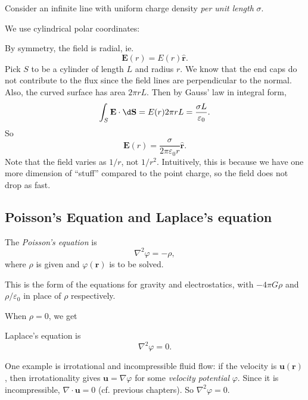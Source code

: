 \documentclass[a4paper]{article}
\begin{document}
\begin{eg}
  Consider an infinite line with uniform charge density \emph{per unit length} $\sigma$.

  We use cylindrical polar coordinates:
  \begin{center}
  \end{center}

  By symmetry, the field is radial, ie.
  \[
    \mathbf{E}(r) = E(r) \hat{\mathbf{r}}.
  \]
  Pick $S$ to be a cylinder of length $L$ and radius $r$. We know that the end caps do not contribute to the flux since the field lines are perpendicular to the normal. Also, the curved surface has area $2\pi r L$. Then by Gauss' law in integral form,
  \[
    \int_S\mathbf{E}\cdot \d \mathbf{S} = E(r)2\pi rL = \frac{\sigma L}{\varepsilon_0}.
  \]
  So
  \[
    \mathbf{E}(r) = \frac{\sigma}{2\pi \varepsilon_0 r} \hat{\mathbf{r}}.
  \]
  Note that the field varies as $1/r$, not $1/r^2$. Intuitively, this is because we have one more dimension of ``stuff'' compared to the point charge, so the field does not drop as fast.
\end{eg}

\subsection{Poisson's Equation and Laplace's equation}
\begin{defi}
  The \emph{Poisson's equation} is
  \[
    \nabla^2 \varphi = -\rho,
  \]
  where $\rho$ is given and $\varphi(\mathbf{r})$ is to be solved.
\end{defi}
This is the form of  the equations for gravity and electrostatics, with $-4\pi G \rho$ and $\rho/\varepsilon_0$ in place of $\rho$ respectively.

When $\rho = 0$, we get
\begin{defi}
  Laplace's equation is
  \[
    \nabla^2 \varphi = 0.
  \]
\end{defi}
One example is irrotational and incompressible fluid flow: if the velocity is $\mathbf{u}(\mathbf{r})$,  then irrotationality gives $\mathbf{u} = \nabla \varphi$ for some \emph{velocity potential} $\varphi$. Since it is incompressible, $\nabla\cdot \mathbf{u} = 0$ (cf. previous chapters). So $\nabla^2 \varphi = 0$.
\end{document}
